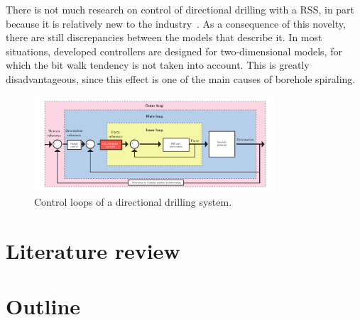There is not much research on control of directional drilling with a \acs{RSS}, in part because it is relatively new to the industry~\cite{Downton2000}. As a consequence of this novelty, there are still discrepancies between the models that describe it. In most situations, developed controllers are designed for two-dimensional models, for which the bit walk tendency is not taken into account. This is greatly disadvantageous, since this effect is one of the main causes of borehole spiraling.

\begin{figure}[ht]\centering
	\includegraphics[width=0.8\textwidth]{img/controlloops.pdf}
	\caption{\label{fig:controlloops}Control loops of a directional drilling system.}
\end{figure}

\section{Literature review}

\section{Outline}

 

 
 



